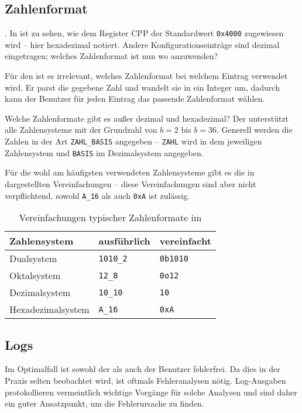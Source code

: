 \subsection{Zahlenformat}
.
In  ist zu sehen, wie dem Register CPP der Standardwert \texttt{0x4000} zugewiesen wird -- hier hexadezimal notiert. Andere Konfigurationseinträge sind dezimal eingetragen; welches Zahlenformat ist nun wo anzuwenden?

Für den \md ist es irrelevant, welches Zahlenformat bei welchem Eintrag verwendet wird. Er parst die gegebene Zahl und wandelt sie in ein Integer um, dadurch kann der Benutzer für jeden Eintrag das passende Zahlenformat wählen.

Welche Zahlenformate gibt es außer dezimal und hexadezimal? Der \md unterstützt alle Zahlensysteme mit der Grundzahl von $b=2$ bis $b=36$. Generell werden die Zahlen in der Art \texttt{ZAHL\_BASIS} angegeben -- \texttt{ZAHL} wird in dem jeweiligen Zahlensystem und \texttt{BASIS} im Dezimalsystem angegeben.

Für die wohl am häufigsten verwendeten Zahlensysteme gibt es die in  dargestellten Vereinfachungen -- diese Vereinfachungen sind aber nicht verpflichtend, sowohl \texttt{A\_16} als auch \texttt{0xA} ist zulässig.

\begin{table}[h]
  \centering
  \begin{tabular}[h]{|lll|}
    \hline
    Zahlensystem      & ausführlich      & vereinfacht     \\
    \hline
    Dualsystem        & \texttt{1010\_2} & \texttt{0b1010} \\
    Oktalsystem       & \texttt{12\_8}   & \texttt{0o12}   \\
    Dezimalsystem     & \texttt{10\_10}  & \texttt{10}     \\
    Hexadezimalsystem & \texttt{A\_16}   & \texttt{0xA}    \\
    \hline
  \end{tabular}
  \caption{Vereinfachungen typischer Zahlenformate im \md}
\end{table}

\subsection{Logs}
Im Optimalfall ist sowohl der \md als auch der Benutzer fehlerfrei. Da dies in der Praxis selten beobachtet wird, ist oftmals Fehleranalysen nötig. Log-Ausgaben protokollieren vermeintlich wichtige Vorgänge für solche Analysen und sind daher ein guter Ansatzpunkt, um die Fehlerursache zu finden.

